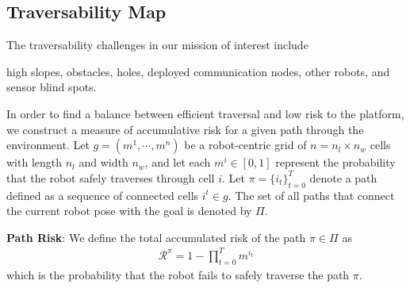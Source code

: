 \documentclass[letterpaper, 10pt, conference]{ieeeconf}      %
\newcommand{\ph}[1]{{\textbf{#1}:}} %
\newcommand{\rev}[1]{{\color{blue} #1 }} %
\begin{document}



\subsection{Traversability Map}

\rev{The traversability challenges in our mission of interest include}

high slopes, obstacles, holes, deployed communication nodes, other robots, and sensor blind spots.  

In order to find a balance between efficient traversal and low risk to the platform, we construct a measure of accumulative risk for a given path through the environment.  
Let $g=(m^1,\cdots,m^n)$ be a \rev{robot-centric}grid of $n=n_l\times n_w$ cells with length $n_l$ and width $n_w$, and let each $m^i\in[0,1]$ represent the probability that the robot safely traverses through cell $i$. 
Let $\pi=\{i_t\}_{t=0}^T$ denote a path defined as a sequence of connected cells $i^t \in g$. \rev{The set of all paths that connect the current robot pose with the goal is denoted by $\Pi$.}

\ph{Path Risk}
We define the total accumulated risk of the path $\pi\in\Pi$ as 
\begin{align}
 \mathcal{R}^{\pi}=1-\prod_{t=0}^Tm^{i_t}
\end{align}
which is the probability that the robot fails to safely traverse the path $\pi$.  
\end{document}

